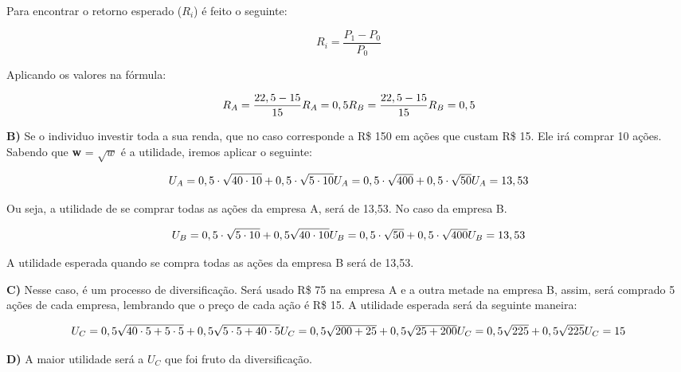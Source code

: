 Para encontrar o retorno esperado ($R_{i}$) é feito o seguinte:

\begin{equation}
	R_{i} = \dfrac{P_{1} - P_{0}}{P_{0}}
\end{equation}

Aplicando os valores na fórmula:

\begin{equation}
	R_{A} = \dfrac{22,5 - 15}{15}
	$$\\$$
	R_{A} = 0,5
	$$\\$$
	R_{B} = \dfrac{22,5 - 15}{15}
	$$\\$$ 
	R_{B} = 0,5
\end{equation}

\singlespacing

\textbf{B)} Se o individuo investir toda a sua renda, que no caso corresponde a R\$ 150 em ações que custam R\$ 15. Ele irá comprar 10 ações. Sabendo que \textbf{w} = $\sqrt{w}$ é a utilidade, iremos aplicar o seguinte:

\begin{equation}
	U_{A} = 0,5 \cdot \sqrt{40 \cdot 10} + 0,5 \cdot \sqrt{{5 \cdot 10}}
	$$\\$$
	U_{A} = 0,5 \cdot \sqrt{400} + 0,5\cdot\sqrt{50} 
	$$\\$$
	U_{A} = 13,53
\end{equation}

Ou seja, a utilidade de se comprar todas as ações da empresa A, será de 13,53. No caso da empresa B.

\begin{equation}
	U_{B} = 0,5 \cdot \sqrt{5 \cdot 10} + 0,5 \sqrt{40 \cdot 10}
	$$\\$$
	U_{B} = 0,5 \cdot \sqrt{50} + 0,5 \cdot \sqrt{400}
	$$\\$$
	U_{B} = 13,53
\end{equation}

A utilidade esperada quando se compra todas as ações da empresa B será de 13,53.

\singlespacing


\textbf{C)} Nesse caso, é um processo de diversificação. Será usado R\$ 75 na empresa A e a outra metade na empresa B, assim, será comprado 5 ações de cada empresa, lembrando que o preço de cada ação é R\$ 15. A utilidade esperada será da seguinte maneira:

\begin{equation}
	U_{C} = 0,5 \sqrt{40 \cdot 5 + 5 \cdot 5} + 0,5 \sqrt{5 \cdot 5 + 40 \cdot 5 }
	$$\\$$
	U_{C} = 0,5 \sqrt{200 + 25} + 0,5 \sqrt{25 + 200}
	$$\\$$
	U_{C} = 0,5 \sqrt{225} + 0,5 \sqrt{225}
	$$\\$$
	U_{C} = 15
\end{equation}

\singlespacing

\textbf{D)} A maior utilidade será a \textbf{$U_{C}$} que foi fruto da diversificação.
